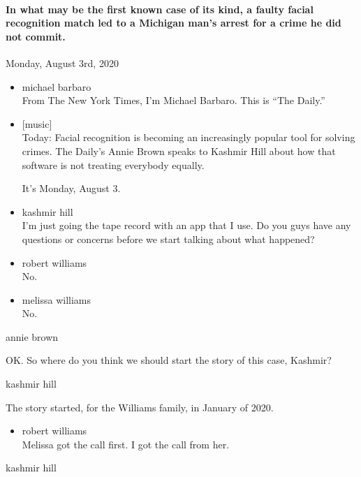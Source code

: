 \hypertarget{in-what-may-be-the-first-known-case-of-its-kind-a-faulty-facial-recognition-match-led-to-a-michigan-mans-arrest-for-a-crime-he-did-not-commit}{%
\paragraph{In what may be the first known case of its kind, a faulty
facial recognition match led to a Michigan man's arrest for a crime he
did not
commit.}\label{in-what-may-be-the-first-known-case-of-its-kind-a-faulty-facial-recognition-match-led-to-a-michigan-mans-arrest-for-a-crime-he-did-not-commit}}

Monday, August 3rd, 2020

\begin{itemize}
\item
  michael barbaro\\
  From The New York Times, I'm Michael Barbaro. This is ``The Daily.''
\item
  {[}music{]}\\
  Today: Facial recognition is becoming an increasingly popular tool for
  solving crimes. The Daily's Annie Brown speaks to Kashmir Hill about
  how that software is not treating everybody equally.

  It's Monday, August 3.
\item
  kashmir hill\\
  I'm just going the tape record with an app that I use. Do you guys
  have any questions or concerns before we start talking about what
  happened?
\item
  robert williams\\
  No.
\item
  melissa williams\\
  No.
\end{itemize}

annie brown

OK. So where do you think we should start the story of this case,
Kashmir?

kashmir hill

The story started, for the Williams family, in January of 2020.

\begin{itemize}
\tightlist
\item
  robert williams\\
  Melissa got the call first. I got the call from her.
\end{itemize}

kashmir hill

